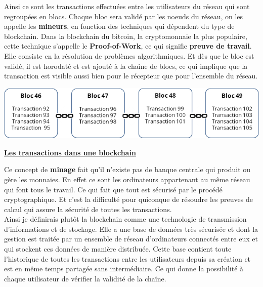 \documentclass[12pt]{report}
\begin{document}
\hspace{1cm} Ainsi ce sont les transactions effectuées entre les utilisateurs du réseau qui sont regroupées en blocs. Chaque bloc sera validé par les noeuds du réseau, on les appelle les \textbf{mineurs},  en fonction des techniques qui dépendent du type de blockchain. Dans la blockchain du bitcoin, la cryptomonnaie la plus populaire, cette technique s'appelle le \textbf{Proof-of-Work}, ce qui signifie \textbf{preuve de travail}. Elle consiste en la résolution de problèmes algorithmiques. Et dès que le bloc est validé, il est horodaté et est ajouté à la chaîne de blocs, ce qui implique que la transaction est visible aussi bien pour le récepteur que pour l'ensemble du réseau.

\begin{center}
    \includegraphics[width=1\textwidth]{block_schema}

    \textbf{\underline{Les transactions dans une blockchain}} \\[1cm]
\end{center}

\hspace{1cm} Ce concept de \textbf{minage} fait qu'il n'existe pas de banque centrale qui produit ou gère les monnaies. En effet ce sont les ordinateurs  appartenant au même réseau qui font tous le travail. Ce qui fait que tout est sécurisé par le procédé cryptographique. Et c'est la difficulté pour quiconque de résoudre les preuves de calcul qui assure la sécurité de toutes les transactions.\\

\hspace{1cm} Ainsi je définirais plutôt la blockchain comme une technologie de transmission d'informations et de stockage. Elle a une base de données très sécurisée et dont la gestion est traitée par un ensemble de réseau d'ordinateurs connectés entre eux et qui stockent ces données de manière distribuée. Cette base contient toute l'historique de toutes les transactions entre les utilisateurs depuis sa création et est en même temps partagée sans intermédiaire. Ce qui donne la possibilité à chaque utilisateur de vérifier la validité de la chaîne.

\end{document}
